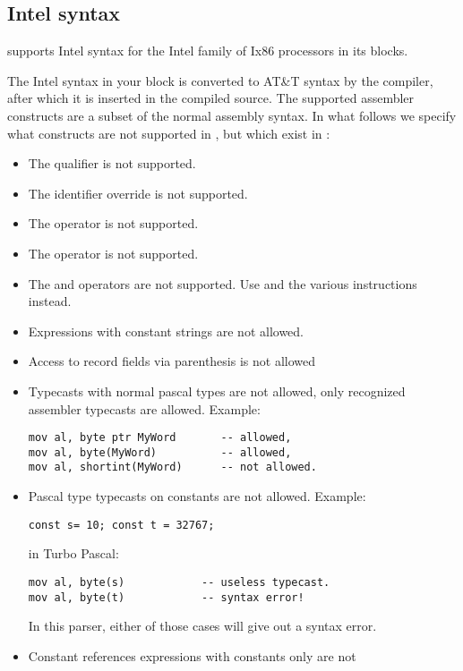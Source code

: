 \subsection{Intel syntax}
\label{se:Intel}

\fpc supports Intel syntax for the Intel family of Ix86 processors
in its  blocks.

The Intel syntax in your  block is converted to AT\&T syntax by the
compiler, after which it is inserted in the compiled source.
The supported assembler constructs are a subset of the normal assembly
syntax. In what follows we specify what constructs are not supported in
\fpc, but which exist in \tp:

\begin{itemize}
\item  The  qualifier is not supported.
\item  The \var{\&} identifier override is not supported.
\item  The  operator is not supported.
\item  The  operator is not supported.
\item  The  and  operators are not supported.
     Use  and the various  instructions instead.
\item  Expressions with constant strings are not allowed.
\item  Access to record fields via parenthesis is not allowed
\item  Typecasts with normal pascal types are not allowed, only
    recognized assembler typecasts are allowed. Example:
\begin{verbatim}
mov al, byte ptr MyWord       -- allowed,
mov al, byte(MyWord)          -- allowed,
mov al, shortint(MyWord)      -- not allowed.
\end{verbatim}
\item  Pascal type typecasts on constants are not allowed.
Example:
\begin{verbatim}
const s= 10; const t = 32767;
\end{verbatim}
in Turbo Pascal:
\begin{verbatim}
mov al, byte(s)            -- useless typecast.
mov al, byte(t)            -- syntax error!
\end{verbatim}
In this parser, either of those  cases will give out a syntax error.
\item  Constant references expressions with constants only are not

\end{itemize}
